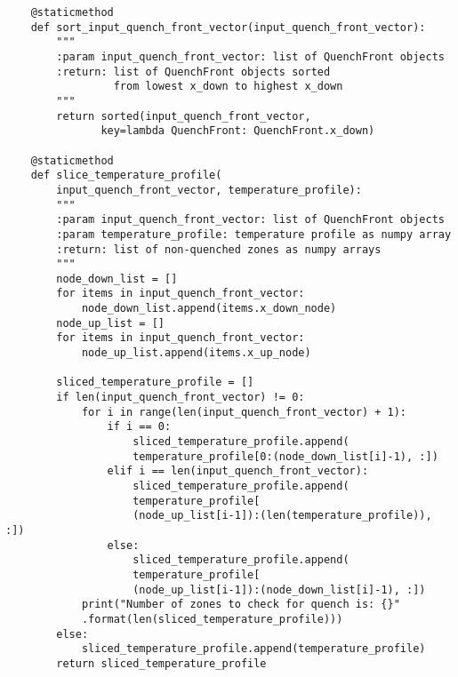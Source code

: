 \begin{verbatim}
    @staticmethod
    def sort_input_quench_front_vector(input_quench_front_vector):
        """
        :param input_quench_front_vector: list of QuenchFront objects
        :return: list of QuenchFront objects sorted 
                 from lowest x_down to highest x_down
        """
        return sorted(input_quench_front_vector, 
               key=lambda QuenchFront: QuenchFront.x_down)

    @staticmethod
    def slice_temperature_profile(
        input_quench_front_vector, temperature_profile):
        """
        :param input_quench_front_vector: list of QuenchFront objects
        :param temperature_profile: temperature profile as numpy array
        :return: list of non-quenched zones as numpy arrays
        """
        node_down_list = []
        for items in input_quench_front_vector:
            node_down_list.append(items.x_down_node)
        node_up_list = []
        for items in input_quench_front_vector:
            node_up_list.append(items.x_up_node)

        sliced_temperature_profile = []
        if len(input_quench_front_vector) != 0:
            for i in range(len(input_quench_front_vector) + 1):
                if i == 0:
                    sliced_temperature_profile.append(
                    temperature_profile[0:(node_down_list[i]-1), :])
                elif i == len(input_quench_front_vector):
                    sliced_temperature_profile.append(
                    temperature_profile[
                    (node_up_list[i-1]):(len(temperature_profile)), :])
                else:
                    sliced_temperature_profile.append(
                    temperature_profile[
                    (node_up_list[i-1]):(node_down_list[i]-1), :])
            print("Number of zones to check for quench is: {}"
            .format(len(sliced_temperature_profile)))
        else:
            sliced_temperature_profile.append(temperature_profile)
        return sliced_temperature_profile


\end{verbatim}
